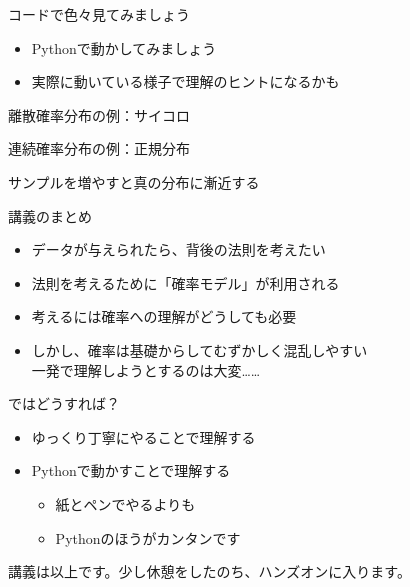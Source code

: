 \documentclass[dvipdfmx,cjk]{beamer}
\begin{document}
\begin{frame}{コードで色々見てみましょう} \pause

\begin{itemize}
    \item Pythonで動かしてみましょう
    \item 実際に動いている様子で理解のヒントになるかも
\end{itemize}

\end{frame}


\begin{frame}{離散確率分布の例：サイコロ}


\end{frame}


\begin{frame}{連続確率分布の例：正規分布}


\end{frame}


\begin{frame}{サンプルを増やすと真の分布に漸近する}


\end{frame}



\begin{frame}{講義のまとめ} \pause

\begin{itemize}
    \item データが与えられたら、背後の法則を考えたい \pause
    \item 法則を考えるために「確率モデル」が利用される \pause
    \item 考えるには確率への理解がどうしても必要 \pause
    \item しかし、確率は基礎からしてむずかしく混乱しやすい\\
          一発で理解しようとするのは大変…… \pause
\end{itemize}

\vskip 0.3cm
ではどうすれば？ \pause

\begin{itemize}
    \item ゆっくり丁寧にやることで理解する \pause
    \item Pythonで動かすことで理解する \pause
        \begin{itemize}
        \item 紙とペンでやるよりも
        \item Pythonのほうがカンタンです
        \end{itemize}
\end{itemize} \pause

\vskip 0.3cm
講義は以上です。少し休憩をしたのち、ハンズオンに入ります。

\end{frame}
\end{document}
